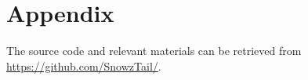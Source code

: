 \appendix
\chapter{Appendix}
The source code and relevant materials can be retrieved from \url{https://github.com/SnowzTail/}.